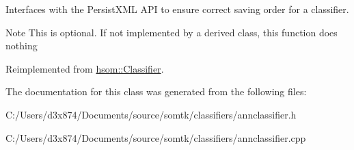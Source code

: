 \-Interfaces with the \-Persist\-X\-M\-L \-A\-P\-I to ensure correct saving order for a classifier. 

\begin{DoxyNote}{\-Note}
\-This is optional. \-If not implemented by a derived class, this function does nothing 
\end{DoxyNote}


\-Reimplemented from \hyperlink{classhsom_1_1_classifier_a44fd60ca14d06f5f3889e3d49573cd75}{hsom\-::\-Classifier}.



\-The documentation for this class was generated from the following files\-:\begin{DoxyCompactItemize}
\item 
\-C\-:/\-Users/d3x874/\-Documents/source/somtk/classifiers/annclassifier.\-h\item 
\-C\-:/\-Users/d3x874/\-Documents/source/somtk/classifiers/annclassifier.\-cpp\end{DoxyCompactItemize}
